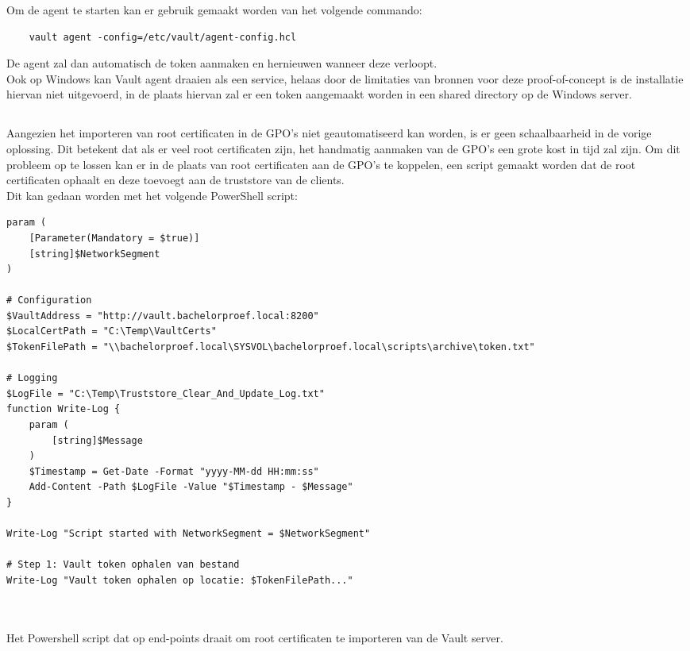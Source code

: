 Om de agent te starten kan er gebruik gemaakt worden van het volgende commando:
\begin{verbatim}
    vault agent -config=/etc/vault/agent-config.hcl
\end{verbatim}

De agent zal dan automatisch de token aanmaken en hernieuwen wanneer deze verloopt. \\

Ook op Windows kan Vault agent draaien als een service, helaas door de limitaties van bronnen voor deze proof-of-concept is de installatie hiervan niet uitgevoerd, in de plaats hiervan zal er een token aangemaakt worden in een shared directory op de Windows server.

\pagebreak

\subsection{}
\label{subsec:Oplossing_voor_Windows_end-points_met_SCCM_en_Vault}

Aangezien het importeren van root certificaten in de GPO's niet geautomatiseerd kan worden, is er geen schaalbaarheid in de vorige oplossing. Dit betekent dat als er veel root certificaten zijn, het handmatig aanmaken van de GPO's een grote kost in tijd zal zijn.
Om dit probleem op te lossen kan er in de plaats van root certificaten aan de GPO's te koppelen, een script gemaakt worden dat de root certificaten ophaalt en deze toevoegt aan de truststore van de clients. \\

Dit kan gedaan worden met het volgende PowerShell script:

\begin{listing}[H]
\begin{verbatim}
param (
    [Parameter(Mandatory = $true)]
    [string]$NetworkSegment
)

# Configuration
$VaultAddress = "http://vault.bachelorproef.local:8200"
$LocalCertPath = "C:\Temp\VaultCerts"
$TokenFilePath = "\\bachelorproef.local\SYSVOL\bachelorproef.local\scripts\archive\token.txt"

# Logging
$LogFile = "C:\Temp\Truststore_Clear_And_Update_Log.txt"
function Write-Log {
    param (
        [string]$Message
    )
    $Timestamp = Get-Date -Format "yyyy-MM-dd HH:mm:ss"
    Add-Content -Path $LogFile -Value "$Timestamp - $Message"
}

Write-Log "Script started with NetworkSegment = $NetworkSegment"

# Step 1: Vault token ophalen van bestand
Write-Log "Vault token ophalen op locatie: $TokenFilePath..."



\end{verbatim}
\caption[Powershell script om root certificaten te importeren van de Vault]{Het Powershell script dat op end-points draait om root certificaten te importeren van de Vault server.}
\end{listing}

